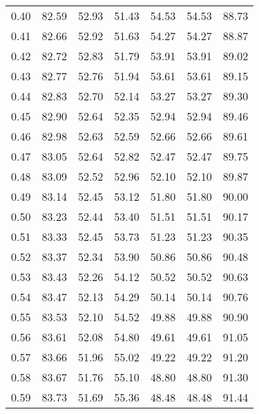 \begin{tabular}{|c|c|c|c|c|c|c|}
      0.40 &     82.59 &     52.93 &      51.43 &   54.53 &      54.53 &         88.73 \\
      0.41 &     82.66 &     52.92 &      51.63 &   54.27 &      54.27 &         88.87 \\
      0.42 &     82.72 &     52.83 &      51.79 &   53.91 &      53.91 &         89.02 \\
      0.43 &     82.77 &     52.76 &      51.94 &   53.61 &      53.61 &         89.15 \\
      0.44 &     82.83 &     52.70 &      52.14 &   53.27 &      53.27 &         89.30 \\
      0.45 &     82.90 &     52.64 &      52.35 &   52.94 &      52.94 &         89.46 \\
      0.46 &     82.98 &     52.63 &      52.59 &   52.66 &      52.66 &         89.61 \\
      0.47 &     83.05 &     52.64 &      52.82 &   52.47 &      52.47 &         89.75 \\
      0.48 &     83.09 &     52.52 &      52.96 &   52.10 &      52.10 &         89.87 \\
      0.49 &     83.14 &     52.45 &      53.12 &   51.80 &      51.80 &         90.00 \\
      0.50 &     83.23 &     52.44 &      53.40 &   51.51 &      51.51 &         90.17 \\
      0.51 &     83.33 &     52.45 &      53.73 &   51.23 &      51.23 &         90.35 \\
      0.52 &     83.37 &     52.34 &      53.90 &   50.86 &      50.86 &         90.48 \\
      0.53 &     83.43 &     52.26 &      54.12 &   50.52 &      50.52 &         90.63 \\
      0.54 &     83.47 &     52.13 &      54.29 &   50.14 &      50.14 &         90.76 \\
      0.55 &     83.53 &     52.10 &      54.52 &   49.88 &      49.88 &         90.90 \\
      0.56 &     83.61 &     52.08 &      54.80 &   49.61 &      49.61 &         91.05 \\
      0.57 &     83.66 &     51.96 &      55.02 &   49.22 &      49.22 &         91.20 \\
      0.58 &     83.67 &     51.76 &      55.10 &   48.80 &      48.80 &         91.30 \\
      0.59 &     83.73 &     51.69 &      55.36 &   48.48 &      48.48 &         91.44 \\

\end{tabular}
